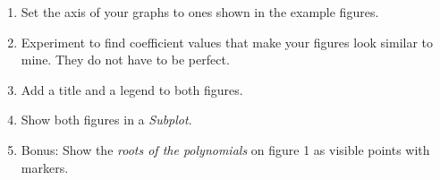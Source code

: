 \documentclass[11pt]{article}
\begin{document}
\begin{description}
\begin{enumerate}
	\item Set the axis of your graphs to ones shown in the example figures.\\
	
 	\item Experiment to find coefficient values that make your figures look similar to mine. They do not have to be perfect.\\
	
	\item Add a title and a legend to both figures.\\
	
	\item Show both figures in a {\it Subplot}.\\
	
	\item Bonus: Show the {\it roots of the polynomials} on figure 1 as visible points with markers.\\
	
        \end{enumerate}
    

            

        \end{description}
 
\end{document}
